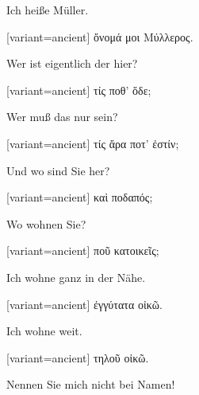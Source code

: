 Ich heiße Müller.

\switchcolumn

\begin{greek}[variant=ancient]%
ὄνομά μοι Μύλλερος.

\end{greek}%
\switchcolumn*

Wer ist eigentlich der hier?

\switchcolumn

\begin{greek}[variant=ancient]%
τίς ποθ' ὅδε;

\end{greek}%
\switchcolumn*

Wer muß das nur sein?

\switchcolumn

\begin{greek}[variant=ancient]%
τίς ἄρα ποτ' ἐστίν;

\end{greek}%
\switchcolumn*

Und wo sind Sie her?

\switchcolumn

\begin{greek}[variant=ancient]%
καὶ ποδαπός;

\end{greek}%
\switchcolumn*

Wo wohnen Sie?

\switchcolumn

\begin{greek}[variant=ancient]%
ποῦ κατοικεῖς;

\end{greek}%
\switchcolumn*

Ich wohne ganz in der Nähe.

\switchcolumn

\begin{greek}[variant=ancient]%
ἐγγύτατα οἰκῶ.

\end{greek}%
\switchcolumn*

Ich wohne weit.

\switchcolumn

\begin{greek}[variant=ancient]%
τηλοῦ οἰκῶ.

\end{greek}%
\switchcolumn*

Nennen Sie mich nicht bei Namen!

\switchcolumn

